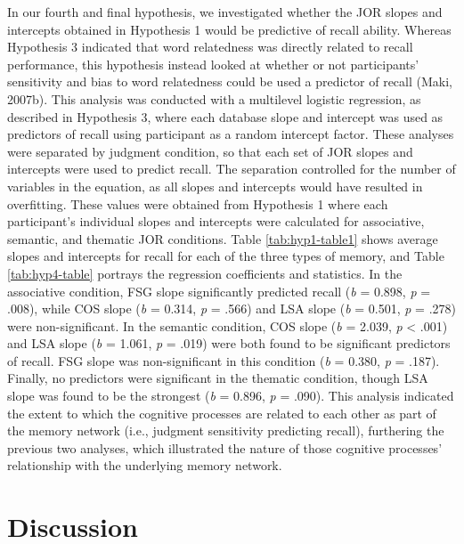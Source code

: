 \documentclass[english,,man]{apa6}
\begin{document}
In our fourth and final hypothesis, we investigated whether the JOR
slopes and intercepts obtained in Hypothesis 1 would be predictive of
recall ability. Whereas Hypothesis 3 indicated that word relatedness was
directly related to recall performance, this hypothesis instead looked
at whether or not participants' sensitivity and bias to word relatedness
could be used a predictor of recall (Maki, 2007b). This analysis was
conducted with a multilevel logistic regression, as described in
Hypothesis 3, where each database slope and intercept was used as
predictors of recall using participant as a random intercept factor.
These analyses were separated by judgment condition, so that each set of
JOR slopes and intercepts were used to predict recall. The separation
controlled for the number of variables in the equation, as all slopes
and intercepts would have resulted in overfitting. These values were
obtained from Hypothesis 1 where each participant's individual slopes
and intercepts were calculated for associative, semantic, and thematic
JOR conditions. Table \ref{tab:hyp1-table1} shows average slopes and
intercepts for recall for each of the three types of memory, and Table
\ref{tab:hyp4-table} portrays the regression coefficients and
statistics. In the associative condition, FSG slope significantly
predicted recall (\emph{b} = 0.898, \emph{p} = .008), while COS slope
(\emph{b} = 0.314, \emph{p} = .566) and LSA slope (\emph{b} = 0.501,
\emph{p} = .278) were non-significant. In the semantic condition, COS
slope (\emph{b} = 2.039, \emph{p} \textless{} .001) and LSA slope
(\emph{b} = 1.061, \emph{p} = .019) were both found to be significant
predictors of recall. FSG slope was non-significant in this condition
(\emph{b} = 0.380, \emph{p} = .187). Finally, no predictors were
significant in the thematic condition, though LSA slope was found to be
the strongest (\emph{b} = 0.896, \emph{p} = .090). This analysis
indicated the extent to which the cognitive processes are related to
each other as part of the memory network (i.e., judgment sensitivity
predicting recall), furthering the previous two analyses, which
illustrated the nature of those cognitive processes' relationship with
the underlying memory network.

\section{Discussion}\label{discussion}
\end{document}
